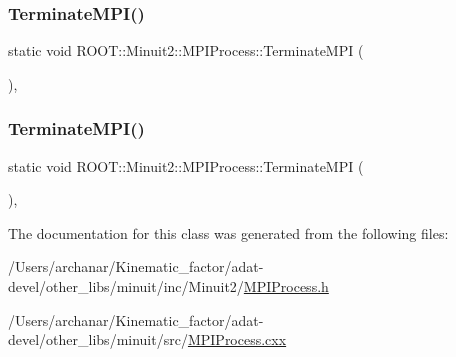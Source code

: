 \subsubsection{\texorpdfstring{TerminateMPI()}{TerminateMPI()}\hspace{0.1cm}{\footnotesize\ttfamily [2/3]}}
{\footnotesize\ttfamily static void R\+O\+O\+T\+::\+Minuit2\+::\+M\+P\+I\+Process\+::\+Terminate\+M\+PI (\begin{DoxyParamCaption}{ }\end{DoxyParamCaption})\hspace{0.3cm}{\ttfamily [inline]}, {\ttfamily [static]}}

\mbox{\label{classROOT_1_1Minuit2_1_1MPIProcess_aa870a057a256be2d95fb7e9d03a9c298}} 
\subsubsection{\texorpdfstring{TerminateMPI()}{TerminateMPI()}\hspace{0.1cm}{\footnotesize\ttfamily [3/3]}}
{\footnotesize\ttfamily static void R\+O\+O\+T\+::\+Minuit2\+::\+M\+P\+I\+Process\+::\+Terminate\+M\+PI (\begin{DoxyParamCaption}{ }\end{DoxyParamCaption})\hspace{0.3cm}{\ttfamily [inline]}, {\ttfamily [static]}}



The documentation for this class was generated from the following files\+:\begin{DoxyCompactItemize}
\item 
/\+Users/archanar/\+Kinematic\+\_\+factor/adat-\/devel/other\+\_\+libs/minuit/inc/\+Minuit2/\mbox{\hyperlink{adat-devel_2other__libs_2minuit_2inc_2Minuit2_2MPIProcess_8h}{M\+P\+I\+Process.\+h}}\item 
/\+Users/archanar/\+Kinematic\+\_\+factor/adat-\/devel/other\+\_\+libs/minuit/src/\mbox{\hyperlink{adat-devel_2other__libs_2minuit_2src_2MPIProcess_8cxx}{M\+P\+I\+Process.\+cxx}}\end{DoxyCompactItemize}
